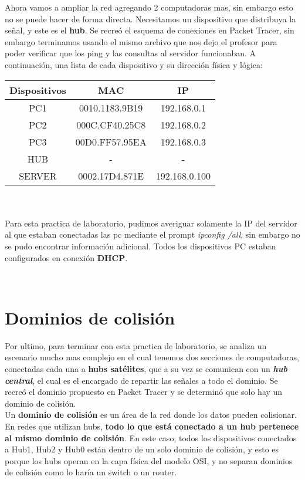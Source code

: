 \documentclass{article}
\begin{document}
Ahora vamos a ampliar la red agregando 2 computadoras mas, sin embargo esto no se puede hacer de forma directa. Necesitamos un dispositivo que distribuya la señal, y este es el \textbf{hub}. Se recreó el esquema de conexiones en Packet Tracer, sin embargo terminamos usando el mismo archivo que nos dejo el profesor para poder verificar que los ping y las consultas al servidor funcionaban. A continuación, una lista de cada dispositivo y su dirección física y lógica:  \\
{\setlength{\parindent}{1pt}
    \begin{tabular}{|c|c|c|}
    \hline
    Dispositivos &MAC  &IP \\
    \hline
    PC1  &0010.1183.9B19  &192.168.0.1 \\
    \hline
    PC2  &000C.CF40.25C8  &192.168.0.2 \\
    \hline
    PC3  &00D0.FF57.95EA  &192.168.0.3 \\
    \hline
    HUB  & - & - \\
    \hline
    SERVER &0002.17D4.871E &192.168.0.100 \\
    \hline
    \end{tabular} \\ \\

Para esta practica de laboratorio, pudimos averiguar solamente la IP del servidor al que estaban conectadas las pc mediante el prompt \textit{ipconfig /all}, sin embargo no se pudo encontrar información adicional. Todos los dispositivos PC estaban configurados en conexión \textbf{DHCP}.} \\

\section{Dominios de colisión}

Por ultimo, para terminar con esta practica de laboratorio, se analiza un escenario mucho mas complejo en el cual tenemos dos secciones de computadoras, conectadas cada una a \textbf{hubs satélites}, que a su vez se comunican con un \textit{\textbf{hub central}}, el cual es el encargado de repartir las señales a todo el dominio. Se recreó el dominio propuesto en Packet Tracer y se determinó que solo hay un dominio de colisión. \\

{\setlength{\parindent}{1pt}Un \textbf{dominio de colisión} es un área de la red donde los datos pueden colisionar. En redes que utilizan hubs, \textbf{todo lo que está conectado a un hub pertenece al mismo dominio de colisión}. En este caso, todos los dispositivos conectados a Hub1, Hub2 y Hub0 están dentro de un solo dominio de colisión, y esto es porque los hubs operan en la capa física del modelo OSI, y no separan dominios de colisión como lo haría un switch o un router.}
\end{document}
